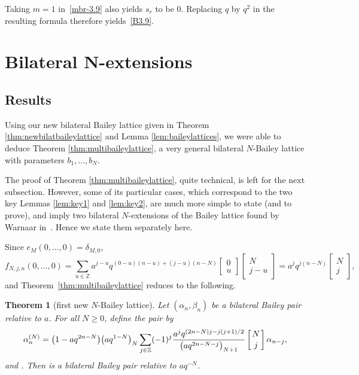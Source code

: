 \documentclass[pdftex]{sigma}
\numberwithin{equation}{section}
\newtheorem{Theorem}{Theorem}[section]
\begin{document}
Taking $m=1$ in~\eqref{mbr-3.9} also yields $s_r$ to be $0$. Replacing $q$ by $q^2$ in the resulting formula therefore yields~\eqref{B3.9}.

\section[Bilateral N-extensions]{Bilateral $\boldsymbol{N}$-extensions}\label{sec:newBailey}

\subsection{Results}
Using our new bilateral Bailey lattice given in Theorem \ref{thm:newbilatbaileylattice} and Lemma \ref{lem:baileylattices}, we were able to deduce Theorem \ref{thm:multibaileylattice}, a very general bilateral $N$-Bailey lattice with parameters $b_1, \dots , b_N$.

The proof of Theorem \ref{thm:multibaileylattice}, quite technical, is left for the next subsection. However, some of its particular cases, which correspond to the two key Lemmas \ref{lem:key1} and \ref{lem:key2}, are much more simple to state (and to prove), and imply two bilateral $N$-extensions of the Bailey lattice found by Warnaar in~\cite[Theorems~3.1 and~3.2]{W}. Hence we state them separately here.

Since $e_M(0,\dots,0)=\delta_{M,0}$,
\begin{equation*}
f_{N,j,n}(0,\ldots,0) =\sum_{u\in \mathbb{Z}} a^{j-u}q^{(0-u)(n-u)+(j-u)(n-N)} \begin{bmatrix}
0\\
u
\end{bmatrix} \begin{bmatrix}
N\\
j-u
\end{bmatrix} = a^j q^{j(n-N)}\begin{bmatrix}
N\\
j
\end{bmatrix},
\end{equation*}
and Theorem~\ref{thm:multibaileylattice} reduces to the following.

\begin{Theorem}[first new $N$-Bailey lattice]\label{thm:Nbaileylattice1}
Let $(\alpha_n, \beta_n)$ be a bilateral Bailey pair relative to $a$. For all $N\geq 0$, define the pair  by
\[%
\alpha^{(N)}_n=\bigl(1-aq^{2n-N}\bigr)\bigl(aq^{1-N}\bigr)_N\sum_{j\in \mathbb{Z}}(-1)^j \frac{a^j q^{(2n-N)j-j(j+1)/2}}{\bigl(aq^{2n-N-j}\bigr)_{N+1}}\left[{N\atop j}\right]\alpha_{n-j},
\]
and
.
Then  is a bilateral Bailey pair relative to $aq^{-N}$.
\end{Theorem}
\end{document}

